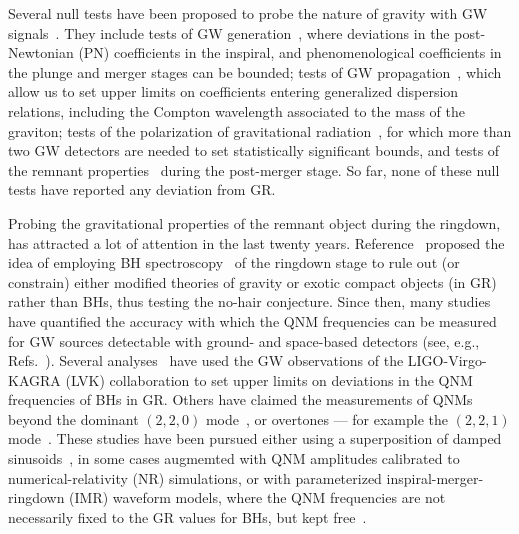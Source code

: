 \documentclass[twocolumn,
               prd,
               aps,
               superscriptaddress,
               tightenlines,
               nofootinbib,
               eqsecnum,
               amsfonts,
               amsmath,
               longbibliography]{revtex4-1}
\begin{document}
Several null tests have been proposed to probe the nature of gravity with GW signals~\cite{TheLIGOScientific:2016src,Yunes:2016jcc,Abbott:2018lct,LIGOScientific:2019fpa,Abbott:2020jks,LIGOScientific:2021sio}. They include tests of GW generation~\cite{Arun:2006yw,Yunes:2009ke,Li:2011cg,Agathos:2013upa,Mehta:2022pcn}, where deviations in the post-Newtonian (PN) coefficients in the inspiral, and phenomenological coefficients in the plunge and merger stages can be bounded; tests of GW propagation~\cite{Will:1997bb}, which allow us to set upper limits on coefficients entering generalized dispersion relations, including the Compton wavelength associated to the
mass of the graviton; tests of the polarization of gravitational radiation~\cite{Will:2014kxa}, for which more than
two GW detectors are needed to set statistically significant bounds, and tests of the remnant properties~\cite{Meidam:2014jpa,Carullo:2018sfu,Brito:2018rfr,Carullo:2019flw,Isi:2019aib,Ghosh:2021mrv,Carullo:2021dui}
during the post-merger stage. So far, none of these null tests have reported any deviation from GR.

Probing the gravitational properties of the remnant object during the
ringdown, has attracted a lot of attention in the last twenty years.
Reference~\cite{Dreyer:2003bv} proposed the idea of employing BH spectroscopy~\cite{Detweiler:1980gk}
of the ringdown stage to rule out (or constrain) either modified theories of
gravity or exotic compact objects (in GR) rather than BHs, thus
testing the no-hair conjecture. Since then, many studies have quantified the accuracy
with which the QNM frequencies can be measured for
GW sources detectable with ground- and space-based detectors (see, e.g., Refs.~\cite{Berti:2005ys,Baibhav:2020tma,Bhagwat:2021kwv,Ota:2021ypb}). Several analyses~\cite{Carullo:2018sfu,
Brito:2018rfr,Carullo:2019flw,Isi:2019aib,Ghosh:2021mrv,Carullo:2021dui}
have used the GW observations of the LIGO-Virgo-KAGRA (LVK) collaboration to set upper
limits on deviations in the QNM frequencies of BHs in GR. Others have claimed
the measurements of QNMs beyond the dominant $(2,2,0)$ mode~\cite{Capano:2021etf},
or overtones --- for example the $(2,2,1)$ mode~\cite{Isi:2019aib,Cotesta:2022pci,Isi:2022mhy}.
%
These studies have been pursued either using a superposition
of damped sinusoids~\cite{Giesler:2019uxc,Carullo:2019flw}, in some cases augmemted with QNM amplitudes calibrated to
numerical-relativity (NR) simulations, or with parameterized inspiral-merger-ringdown (IMR)
waveform models, where the QNM frequencies are not necessarily fixed
to the GR values for BHs, but kept free~\cite{Brito:2018rfr,Ghosh:2021mrv}.
\end{document}
